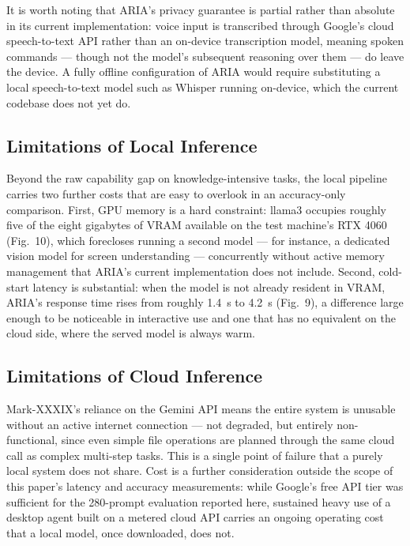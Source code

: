 \documentclass[conference]{IEEEtran}
\begin{document}
It is worth noting that ARIA's privacy guarantee is partial rather than absolute in its current implementation: voice input is transcribed through Google's cloud speech-to-text API rather than an on-device transcription model, meaning spoken commands --- though not the model's subsequent reasoning over them --- do leave the device. A fully offline configuration of ARIA would require substituting a local speech-to-text model such as Whisper running on-device, which the current codebase does not yet do.

\subsection{Limitations of Local Inference}

Beyond the raw capability gap on knowledge-intensive tasks, the local pipeline carries two further costs that are easy to overlook in an accuracy-only comparison. First, GPU memory is a hard constraint: llama3 occupies roughly five of the eight gigabytes of VRAM available on the test machine's RTX 4060 (Fig.~10), which forecloses running a second model --- for instance, a dedicated vision model for screen understanding --- concurrently without active memory management that ARIA's current implementation does not include. Second, cold-start latency is substantial: when the model is not already resident in VRAM, ARIA's response time rises from roughly 1.4~s to 4.2~s (Fig.~9), a difference large enough to be noticeable in interactive use and one that has no equivalent on the cloud side, where the served model is always warm.

\subsection{Limitations of Cloud Inference}

Mark-XXXIX's reliance on the Gemini API means the entire system is unusable without an active internet connection --- not degraded, but entirely non-functional, since even simple file operations are planned through the same cloud call as complex multi-step tasks. This is a single point of failure that a purely local system does not share. Cost is a further consideration outside the scope of this paper's latency and accuracy measurements: while Google's free API tier was sufficient for the 280-prompt evaluation reported here, sustained heavy use of a desktop agent built on a metered cloud API carries an ongoing operating cost that a local model, once downloaded, does not.
\end{document}
